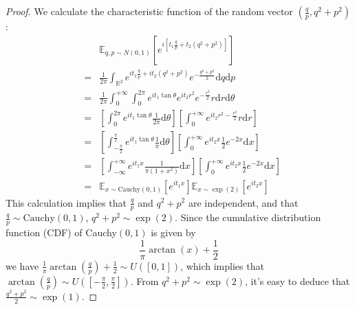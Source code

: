 \documentclass{article}
\begin{document}
\begin{proof}
We calculate the characteristic function of the
random vector $\left( \frac{q}{p}, q^2 + p^2 \right)$:
\begin{eqnarray*}
  &  & \mathbb{E}_{q, p \sim N (0, 1)} \left[ e^{i \left[ t_1 \frac{q}{p} +
  t_2 (q^2 + p^2) \right]} \right]\\
  & = & \frac{1}{2 \pi} \int_{\mathbb{R}^2} e^{it_1 \frac{q}{p} + it_2 (q^2 +
  p^2)} e^{- \frac{q^2 + p^2}{2}} \mathrm{d} q \mathrm{d} p\\
  & = & \frac{1}{2 \pi} \int_0^{+ \infty} \int_0^{2 \pi} e^{it_1 \tan \theta}
  e^{it_2 r^2} e^{- \frac{r^2}{2}} r \mathrm{d} r \mathrm{d} \theta\\
  & = & \left[ \int_0^{2 \pi} e^{it_1 \tan \theta} \frac{1}{2 \pi} \mathrm{d}
  \theta \right] \left[ \int_0^{+ \infty} e^{it_2 r^2 - \frac{r^2}{2}} r
  \mathrm{d} r \right]\\
  & = & \left[ \int_{- \frac{\pi}{2}}^{\frac{\pi}{2}} e^{it_1 \tan \theta}
	  \frac{1}{\pi} \mathrm{d} \theta \right] \left[ \int_0^{+ \infty} e^{it_2 x}
  \frac{1}{2} e^{- 2 x} \mathrm{d} x \right]\\
  & = & \left[ \int_{- \infty}^{+ \infty} e^{it_1 x} \frac{1}{\pi (1 + x^2)}
	  \mathrm{d} x \right] \left[ \int_0^{+ \infty} e^{it_2 x} \frac{1}{2} e^{- 2 x}
  \mathrm{d} x \right]\\
  & = & \mathbb{E}_{x \sim \text{Cauchy} (0, 1)} [e^{it_1 x}] \mathbb{E}_{x
  \sim \exp (2)} [e^{it_2 x}]
\end{eqnarray*}
This calculation implies that $\frac{q}{p}$ and $q^2 + p^2$ are independent,
and that $\frac{q}{p} \sim \text{Cauchy} (0, 1)$, $q^2 + p^2 \sim \exp (2)$.
Since the cumulative distribution function (CDF) of Cauchy$(0, 1)$ is given by
\[ \frac{1}{\pi} \arctan (x) + \frac{1}{2} \]
we have $\frac{1}{\pi} \arctan \left( \frac{q}{p} \right) + \frac{1}{2} \sim U
([0, 1])$, which implies that $\arctan \left( \frac{q}{p} \right) \sim U
\left( \left[ - \frac{\pi}{2}, \frac{\pi}{2} \right] \right)$. From $q^2 + p^2
\sim \exp (2)$, it's easy to deduce that $\frac{q^2 + p^2}{2} \sim \exp
(1)$.
\end{proof}
\end{document}
